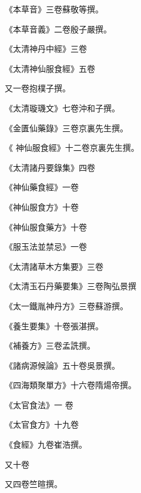 \begin{pinyinscope}
 《本草音》三卷蘇敬等撰。



 《本草音義》二卷殷子嚴撰。



 《太清神丹中經》三卷



 《太清神仙服食經》五卷



 又一卷抱樸子撰。



 《太清璇璣文》七卷沖和子撰。



 《金匱仙藥錄》三卷京裏先生撰。



 《
 神仙服食經》十二卷京裏先生撰。



 《太清諸丹要錄集》四卷



 《神仙藥食經》一卷



 《神仙服食方》十卷



 《神仙服食藥方》十卷



 《服玉法並禁忌》一卷



 《太清諸草木方集要》三卷



 《太清玉石丹藥要集》三卷陶弘景撰



 《太一鐵胤神丹方》三卷蘇游撰。



 《養生要集》十卷張湛撰。



 《補養方》三卷孟詵撰。



 《諸病源候論》五十卷吳景撰。



 《四海類聚單方》十六卷隋煬帝撰。



 《太官食法》一
 卷



 《太官食方》十九卷



 《食經》九卷崔浩撰。



 又十卷



 又四卷竺暄撰。




\end{pinyinscope}

